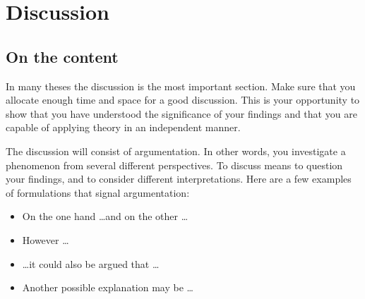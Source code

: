 \chapter{Discussion}
\label{chp:discussion}
\section{On the content}
In many theses the discussion is the most important section. Make sure that you allocate enough time and space for a good discussion. This is your opportunity to show that you have understood the significance of your findings and that you are capable of applying theory in an independent manner.

The discussion will consist of argumentation. In other words, you investigate a phenomenon from several different perspectives. To discuss means to question your findings, and to consider different interpretations. Here are a few examples of formulations that signal argumentation:

\begin{itemize}
    \item On the one hand \dots and on the other \dots 
    \item However \dots
    \item \dots it could also be argued that \dots
    \item Another possible explanation may be \dots
\end{itemize}

